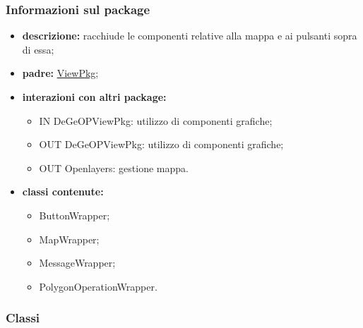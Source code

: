 \subsubsection{Informazioni sul package}
\begin{itemize}
	\item \textbf{descrizione:} racchiude le componenti relative alla mappa e ai pulsanti sopra di essa;
	\item \textbf{padre:} \hyperref[pkg::ViewPkg]{ViewPkg};
	\item \textbf{interazioni con altri package:} 
	\begin{itemize}
		\item IN DeGeOPViewPkg: utilizzo di componenti grafiche;
		\item OUT DeGeOPViewPkg: utilizzo di componenti grafiche;
		\item OUT Openlayers: gestione mappa.
	\end{itemize}
	\item \textbf{classi contenute:}
	\begin{itemize}
		\item ButtonWrapper;
		\item MapWrapper;
		\item MessageWrapper;
		\item PolygonOperationWrapper.
	\end{itemize}
\end{itemize}
\subsubsection{Classi}
